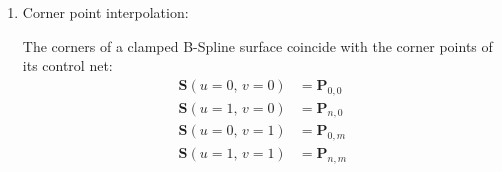 \begin{enumerate}
    \item Corner point interpolation:
    
    The corners of a clamped B-Spline surface coincide with the corner points of its control net:
    \begin{align*}
        \mathbf{S}(u=0,\, v=0) &= \mathbf{P}_{0, 0} \\
        \mathbf{S}(u=1,\, v=0) &= \mathbf{P}_{n, 0} \\
        \mathbf{S}(u=0,\, v=1) &= \mathbf{P}_{0, m} \\
        \mathbf{S}(u=1,\, v=1) &= \mathbf{P}_{n, m} \\
    \end{align*}
    

    
\end{enumerate}



